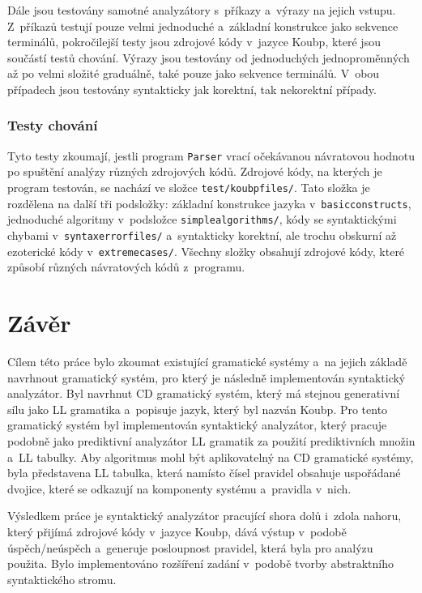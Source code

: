 Dále jsou testovány samotné analyzátory s~příkazy a~výrazy na jejich vstupu.
Z~příkazů testují pouze velmi jednoduché a~základní konstrukce jako sekvence terminálů, pokročilejší testy jsou zdrojové kódy v~jazyce Koubp, které jsou součástí testů chování.
Výrazy jsou testovány od jednoduchých jednoproměnných až po velmi složité graduálně, také pouze jako sekvence terminálů.
V~obou případech jsou testovány syntakticky jak korektní, tak nekorektní případy.

\subsection*{Testy chování}
Tyto testy zkoumají, jestli program \texttt{Parser} vrací očekávanou návratovou hodnotu po spuštění analýzy různých zdrojových kódů.
Zdrojové kódy, na kterých je program testován, se nachází ve složce \texttt{test/koubp\textunderscore files/}.
Tato složka je rozdělena na další tři podsložky: základní konstrukce jazyka v~\texttt{basic\textunderscore constructs}, jednoduché algoritmy v~podsložce \texttt{simple\textunderscore algorithms/}, kódy se syntaktickými chybami v~\texttt{syntax\textunderscore error\textunderscore files/} a~syntakticky korektní, ale trochu obskurní až ezoterické kódy v~\texttt{extreme\textunderscore cases/}.
Všechny složky obsahují zdrojové kódy, které způsobí různých návratových kódů z~programu.

\cleardoublepage

\chapter{Závěr}
Cílem této práce bylo zkoumat existující gramatické systémy a~na jejich základě navrhnout gramatický systém, pro který je následně implementován syntaktický analyzátor.
Byl navrhnut CD gramatický systém, který má stejnou generativní sílu jako LL gramatika a~popisuje jazyk, který byl nazván Koubp.
Pro tento gramatický systém byl implementován syntaktický analyzátor, který pracuje podobně jako prediktivní analyzátor LL gramatik za použití prediktivních množin a~LL tabulky.
Aby algoritmus mohl být aplikovatelný na CD gramatické systémy, byla představena LL tabulka, která namísto čísel pravidel obsahuje uspořádané dvojice, které se odkazují na komponenty systému a~pravidla v~nich.

Výsledkem práce je syntaktický analyzátor pracující shora dolů i~zdola nahoru, který přijímá zdrojové kódy v~jazyce Koubp, dává výstup v~podobě úspěch/neúspěch a~generuje posloupnost pravidel, která byla pro analýzu použita.
Bylo implementováno rozšíření zadání v~podobě tvorby abstraktního syntaktického stromu.

